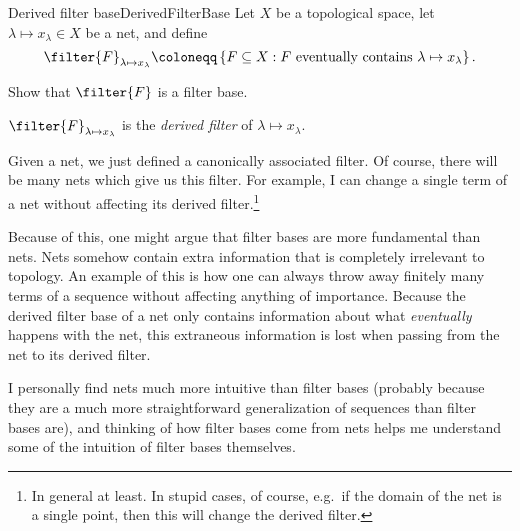 \begin{dfn}{Derived filter base}{DerivedFilterBase}
Let $X$ be a topological space, let $\lambda \mapsto x_\lambda \in X$ be a net, and define
\begin{equation}
\filter{F}_{\lambda \mapsto x_\lambda}\coloneqq \left\{ F\subseteq X:F\text{ eventually contains }\lambda \mapsto x_\lambda \right\} .
\end{equation}
\begin{exr}[breakable=false]{}{}
Show that $\filter{F}$ is a filter base.
\end{exr}
$\filter{F}_{\lambda \mapsto x_\lambda}$ is the \emph{derived filter} of $\lambda \mapsto x_\lambda$.
\begin{rmk}
Given a net, we just defined a canonically associated filter.  Of course, there will be many nets which give us this filter.  For example, I can change a single term of a net without affecting its derived filter.\footnote{In general at least.  In stupid cases, of course, e.g.~if the domain of the net is a single point, then this will change the derived filter.}
\end{rmk}
\begin{rmk}
Because of this, one might argue that filter bases are more fundamental than nets.  Nets somehow contain extra information that is completely irrelevant to topology.  An example of this is how one can always throw away finitely many terms of a sequence without affecting anything of importance.  Because the derived filter base of a net only contains information about what \emph{eventually} happens with the net, this extraneous information is lost when passing from the net to its derived filter.
\end{rmk}
\begin{rmk}
I personally find nets much more intuitive than filter bases (probably because they are a much more straightforward generalization of sequences than filter bases are), and thinking of how filter bases come from nets helps me understand some of the intuition of filter bases themselves.
\end{rmk}
\end{dfn}

